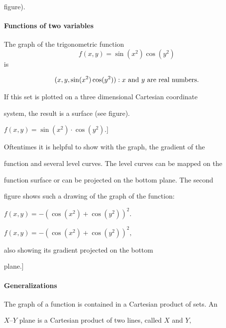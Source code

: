 figure).



\paragraph{Functions of two variables}



The graph of the trigonometric function $$f(x,y) = \sin(x^2)\cos(y^2)$$ is

$$\\{(x, y, \sin(x^2) \cos(y^2)) : x \text{ and } y \text{ are real numbers} \\}.$$



If this set is plotted on a three dimensional Cartesian coordinate

system, the result is a surface (see figure).




$f(x, y) = \sin\left(x^2\right) \cdot \cos\left(y^2\right).$]



Oftentimes it is helpful to show with the graph, the gradient of the

function and several level curves. The level curves can be mapped on the

function surface or can be projected on the bottom plane. The second

figure shows such a drawing of the graph of the function:

$f(x, y) = -(\cos(x^2) + \cos(y^2))^2.$




$f(x, y) = - \left(\cos\left(x^2\right) + \cos\left(y^2\right)\right)^2,$

also showing its gradient projected on the bottom

plane.]



\paragraph{Generalizations}



The graph of a function is contained in a Cartesian product of sets. An

$X$--$Y$ plane is a Cartesian product of two lines, called $X$ and $Y,$

